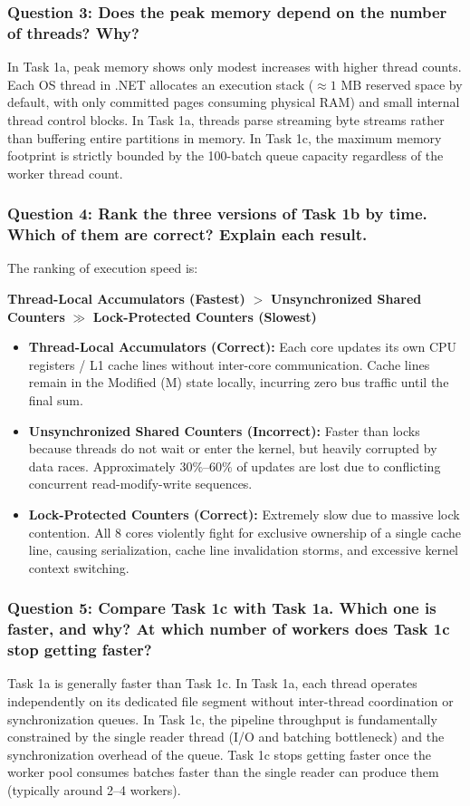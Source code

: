 \documentclass[12pt,a4paper]{article}
\begin{document}
\subsubsection{Question 3: Does the peak memory depend on the number of threads? Why?}
In Task 1a, peak memory shows only modest increases with higher thread counts. Each OS thread in .NET allocates an execution stack ($\approx 1\text{ MB}$ reserved space by default, with only committed pages consuming physical RAM) and small internal thread control blocks. In Task 1a, threads parse streaming byte streams rather than buffering entire partitions in memory. In Task 1c, the maximum memory footprint is strictly bounded by the 100-batch queue capacity regardless of the worker thread count.

\subsubsection{Question 4: Rank the three versions of Task 1b by time. Which of them are correct? Explain each result.}
The ranking of execution speed is:
\begin{center}
\textbf{Thread-Local Accumulators (Fastest)} $>$ \textbf{Unsynchronized Shared Counters} $\gg$ \textbf{Lock-Protected Counters (Slowest)}
\end{center}

\begin{itemize}
    \item \textbf{Thread-Local Accumulators (Correct):} Each core updates its own CPU registers / L1 cache lines without inter-core communication. Cache lines remain in the Modified (M) state locally, incurring zero bus traffic until the final sum.
    \item \textbf{Unsynchronized Shared Counters (Incorrect):} Faster than locks because threads do not wait or enter the kernel, but heavily corrupted by data races. Approximately $30\%\text{--}60\%$ of updates are lost due to conflicting concurrent read-modify-write sequences.
    \item \textbf{Lock-Protected Counters (Correct):} Extremely slow due to massive lock contention. All 8 cores violently fight for exclusive ownership of a single cache line, causing serialization, cache line invalidation storms, and excessive kernel context switching.
\end{itemize}

\subsubsection{Question 5: Compare Task 1c with Task 1a. Which one is faster, and why? At which number of workers does Task 1c stop getting faster?}
Task 1a is generally faster than Task 1c. In Task 1a, each thread operates independently on its dedicated file segment without inter-thread coordination or synchronization queues. In Task 1c, the pipeline throughput is fundamentally constrained by the single reader thread (I/O and batching bottleneck) and the synchronization overhead of the queue. Task 1c stops getting faster once the worker pool consumes batches faster than the single reader can produce them (typically around 2--4 workers).
\end{document}
